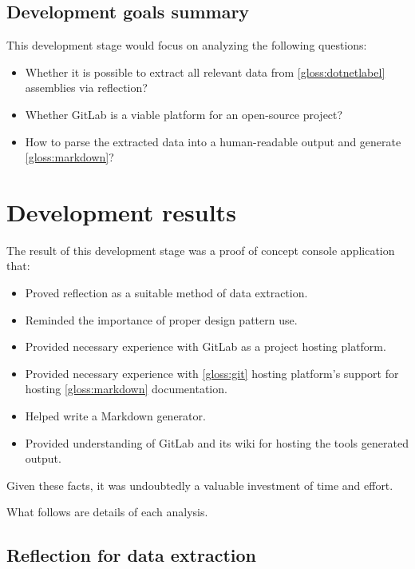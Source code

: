 \subsection{Development goals summary}
This development stage would focus on analyzing the following questions:
\begin{itemize}
    \item Whether it is possible to extract all relevant data from \ref{gloss:dotnetlabel} assemblies via reflection?
    \item Whether GitLab is a viable platform for an open-source project?
    \item How to parse the extracted data into a human-readable output and generate \ref{gloss:markdown}?
\end{itemize}

\section{Development results}

The result of this development stage was a proof of concept console application that:
\begin{itemize}
    \item Proved reflection as a suitable method of data extraction.
    \item Reminded the importance of proper design pattern use.
    \item Provided necessary experience with GitLab as a project hosting platform.
    \item Provided necessary experience with \ref{gloss:git} hosting platform's support for hosting \ref{gloss:markdown} documentation.
    \item Helped write a Markdown generator.
    \item Provided understanding of GitLab and its wiki for hosting the tools generated output.
\end{itemize}

Given these facts, it was undoubtedly a valuable investment of time and effort.

What follows are details of each analysis.

\subsection{Reflection for data extraction}

